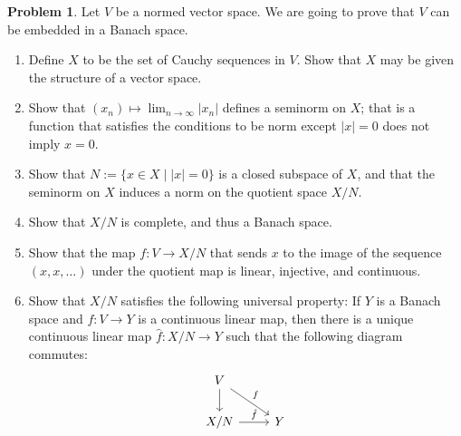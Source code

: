\documentclass[11pt]{article}
\theoremstyle{definition}
\newtheorem{prob}{Problem}
\begin{document}
\begin{prob}
Let $V$ be a normed vector space.
We are going to prove that $V$ can be embedded in a Banach space.
\begin{enumerate}
\item
Define $X$ to be the set of Cauchy sequences in $V$.
Show that $X$ may be given the structure of a vector space.

\item
Show that $(x_n) \mapsto \lim_{n \to \infty} |x_n|$ defines a seminorm on $X$;
that is a function that satisfies the conditions to be norm except $|x| = 0$
does not imply $x = 0$.

\item
Show that $N := \{ x \in X \mid |x| = 0 \}$ is a closed subspace of $X$, and that
the seminorm on $X$ induces a norm on the quotient space $X / N$.

\item
Show that $X / N$ is complete, and thus a Banach space.

\item
Show that the map $f : V \to X / N$ that sends $x$ to the image of the sequence
$(x,x,\ldots)$ under the quotient map is linear, injective, and continuous.

\item
Show that $X / N$ satisfies the following universal property:
If $Y$ is a Banach space and $f : V \to Y$ is a continuous linear map, then
there is a unique continuous linear map $\hat f : X/N \to Y$ such that the
following diagram commutes:
\[
\begin{tikzcd}
V \ar[dr,"f"] \ar[d] &
\\
X/N \ar[r,"\hat{f}"] & Y
\end{tikzcd}
\]
\end{enumerate}
\end{prob}
\end{document}
